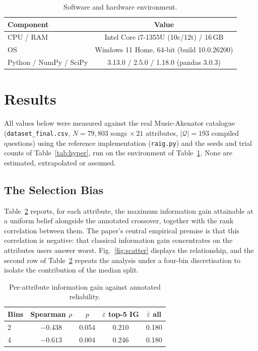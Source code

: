 \documentclass[conference]{IEEEtran}
\newcommand{\Qset}{\mathcal{Q}}
\begin{document}
\begin{table}[t]
\caption{Software and hardware environment.}
\label{tab:env}
\centering
\footnotesize
\begin{tabular}{@{}lc@{}}
\toprule
\textbf{Component} & \textbf{Value} \\
\midrule
CPU / RAM & Intel Core i7-1355U (10c/12t) / 16\,GB \\
OS & Windows 11 Home, 64-bit (build 10.0.26200) \\
Python / NumPy / SciPy & 3.13.0 / 2.5.0 / 1.18.0 (pandas 3.0.3) \\
\bottomrule
\end{tabular}
\end{table}

\section{Results}

\noindent All values below were measured against the real Music-Akenator
catalogue (\texttt{dataset\_final.csv}, $N=79{,}803$ songs $\times\,21$
attributes, $|\Qset|=193$ compiled questions) using the reference
implementation (\texttt{raig.py}) and the seeds and trial counts of
Table~\ref{tab:hyper}, run on the environment of Table~\ref{tab:env}. None are
estimated, extrapolated or assumed.

\subsection{The Selection Bias}

Table~\ref{tab:pathology} reports, for each attribute, the maximum information
gain attainable at a uniform belief alongside the annotated crossover, together
with the rank correlation between them. The paper's central empirical premise
is that this correlation is negative: that classical information gain
concentrates on the attributes users answer worst. Fig.~\ref{fig:scatter}
displays the relationship, and the second row of Table~\ref{tab:pathology}
repeats the analysis under a four-bin discretisation to isolate the
contribution of the median split.

\begin{table}[t]
\caption{Per-attribute information gain against annotated reliability.}
\label{tab:pathology}
\centering
\footnotesize
\begin{tabular}{@{}lcccc@{}}
\toprule
\textbf{Bins} & \textbf{Spearman $\rho$} & \textbf{$p$} & \textbf{$\bar\varepsilon$ top-5 IG} & \textbf{$\bar\varepsilon$ all} \\
\midrule
2 & $-0.438$ & 0.054 & 0.210 & 0.180 \\
4 & $-0.613$ & 0.004 & 0.246 & 0.180 \\
\bottomrule
\end{tabular}
\end{table}
\end{document}
